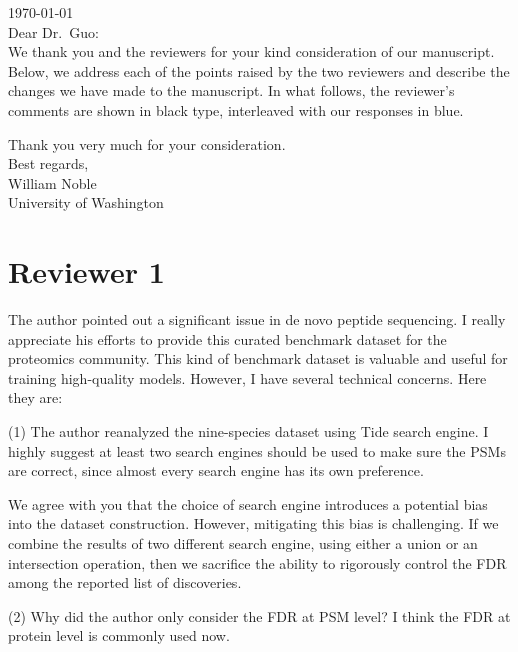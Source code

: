 \documentclass{article}
\newcommand{\response}[1]{\vspace*{1ex} \color{blue} \noindent #1 \color{black}
	\vspace*{2ex}}
\begin{document}
\noindent
\today\\[2ex]

\noindent
Dear Dr.\ Guo:\\[2ex]

We thank you and the reviewers for your kind consideration of our manuscript.
Below, we address each of the points raised by the two reviewers and describe the changes we have made to the manuscript.
In what follows, the reviewer's comments are shown in black type, interleaved with our responses in blue.

Thank you very much for your consideration.\\[2ex]

\noindent
Best regards,\\[2ex]

\noindent
William Noble\\
University of Washington

\clearpage
\section*{Reviewer 1}

The author pointed out a significant issue in de novo peptide sequencing. I really appreciate his efforts to provide this curated benchmark dataset for the proteomics community. This kind of benchmark dataset is valuable and useful for training high-quality models. However, I have several technical concerns. Here they are:

(1) The author reanalyzed the nine-species dataset using Tide search engine. I highly suggest at least two search engines should be used to make sure the PSMs are correct, since almost every search engine has its own preference.

\response{We agree with you that the choice of search engine introduces a potential bias into the dataset construction.
  However, mitigating this bias is challenging.
  If we combine the results of two different search engine, using either a union or an intersection operation, then we sacrifice the ability to rigorously control the FDR among the reported list of discoveries.}

(2) Why did the author only consider the FDR at PSM level? I think the FDR at protein level is commonly used now.
\end{document}

